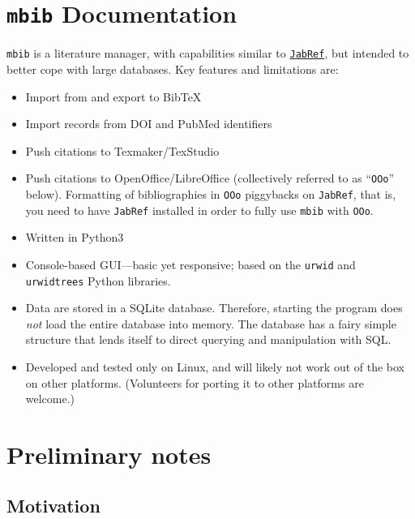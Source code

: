 \documentclass[10pt]{article}
\newcommand{\mbib}{\texttt{mbib}\xspace}
\newcommand{\jabref}{\texttt{JabRef}\xspace}
\newcommand*{\ooo}{\texttt{OOo}\xspace}
\begin{document}
\section*{\mbib Documentation}

\mbib is a literature manager, with capabilities similar to \href{http://www.jabref.org}{\jabref}, but intended to better cope with large databases.  Key features and limitations are:

\begin{itemize}
\item Import from and export to BibTeX  

\item Import records from DOI and PubMed identifiers

\item Push citations to Texmaker/TexStudio

\item Push citations to OpenOffice/LibreOffice (collectively referred to as ``\ooo'' below). Formatting of bibliographies in \ooo piggybacks on \jabref, that is, you need to have \jabref installed in order to fully use \mbib with \ooo.

\item Written in Python3

\item Console-based GUI---basic yet responsive; based on the \texttt{urwid} and
\texttt{urwidtrees} Python libraries. 

\item Data are stored in a SQLite database. Therefore, starting the program does \emph{not} load the entire database into memory. The database has a fairy simple structure that lends itself to direct querying and manipulation with SQL.

\item Developed and tested only on Linux, and will likely not work out of the box on other platforms. (Volunteers for porting it to other platforms are welcome.)

\end{itemize}

\section{Preliminary notes}

\subsection{Motivation}
\end{document}
